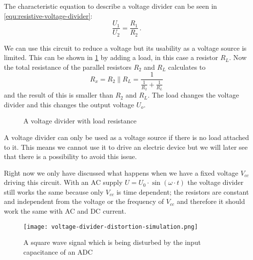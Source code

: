 The characteristic equation to describe a voltage divider can be seen in \cref{equ:resistive-voltage-divider}:
\begin{equation}
	\frac{U_1}{U_2} = \frac{R_1}{R_2}\,.
	\label{equ:resistive-voltage-divider}
\end{equation}

We can use this circuit to reduce a voltage but its usability as a voltage source is limited. This can be shown in \cref{fig:loaded-voltage-divider} by adding a load, in this case a resistor $R_L$. Now the total resistance of the parallel resistors $R_2$ and $R_L$ calculates to
\begin{equation*}
	R_x = R_2 \parallel R_L = \frac{1}{\frac{1}{R_2} + \frac{1}{R_L}}
\end{equation*}
and the result of this is smaller than $R_2$ and $R_L$. The load changes the voltage divider and this changes the output voltage $U_o$.


\begin{figure}[htb]
	\centering
	\caption{A voltage divider with load resistance}
	\label{fig:loaded-voltage-divider}
\end{figure}

A voltage divider can only be used as a voltage source if there is no load attached to it. This means we cannot use it to drive an electric device but we will later see that there is a possibility to avoid this issue.

Right now we only have discussed what happens when we have a fixed voltage $V_{cc}$ driving this circuit. With an AC supply $U = U_0 \cdot \sin(\omega \cdot t)$ the voltage divider still works the same because only $V_{cc}$ is time dependent; the resistors are constant and independent from the voltage or the frequency of $V_{cc}$ and therefore it should work the same with AC and DC current.

\begin{figure}[htb]
		\centering
		\texttt{[image: voltage-divider-distortion-simulation.png]}
		\caption{A square wave signal which is being disturbed by the input capacitance of an ADC}
		\label{fig:voltage-divider-distortion}
\end{figure}

